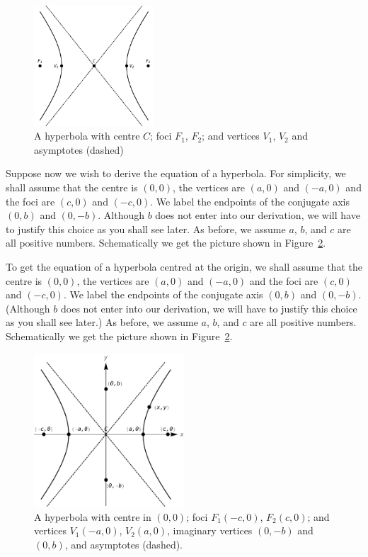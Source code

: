 \begin{figure}[H]
	\begin{center}
			\includegraphics[width=0.4\textwidth]{fig_algebraic_32}
	\caption{A hyperbola with centre $C$; foci $F_1$, $F_2$; and vertices $V_1$, $V_2$ and asymptotes (dashed)}
	\label{fig_algebraic_32}
	\end{center}
\end{figure}

\ifcourse
Suppose now we wish to derive the equation of a hyperbola.  For simplicity, we shall assume that the centre is $(0,0)$,  the vertices are $(a,0)$ and $(-a,0)$ and the foci are $(c,0)$ and $(-c,0)$.  We label the endpoints of the conjugate axis $(0,b)$ and $(0,-b)$. Although $b$ does not enter into our derivation, we will have to justify this choice as you shall see later. As before, we assume $a$, $b$, and $c$ are all positive numbers.  Schematically we get the picture shown in Figure~\ref{fig_algebraic_33}. 
\fi

\ifvc
To get the equation of a hyperbola centred at the origin, we shall assume that the centre is $(0,0)$,  the vertices are $(a,0)$ and $(-a,0)$ and the foci are $(c,0)$ and $(-c,0)$.  We label the endpoints of the conjugate axis $(0,b)$ and $(0,-b)$.  (Although $b$ does not enter into our derivation, we will have to justify this choice as you shall see later.)  As before, we assume $a$, $b$, and $c$ are all positive numbers.  Schematically we get the picture shown in Figure~\ref{fig_algebraic_33}. 
\fi

\begin{figure}[h]
	\begin{center}
			\includegraphics[width=0.5\textwidth]{fig_algebraic_33}
	\caption{A hyperbola with centre in $(0,0)$; foci $F_1 (-c,0)$, $F_2 (c,0)$; and vertices $V_1 (-a,0)$, $V_2 (a,0)$, imaginary vertices $(0,-b)$ and $(0,b)$, and asymptotes (dashed).}
	\label{fig_algebraic_33}
	\end{center}
\end{figure}


